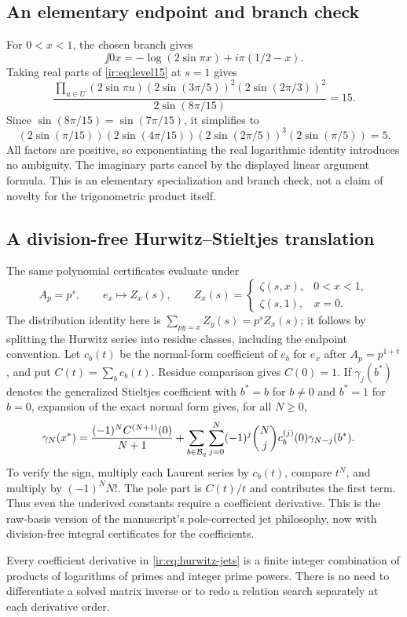 \subsection{An elementary endpoint and branch check}
For $0<x<1$, the chosen branch gives
\[
 \jj{0}{x}=-\log(2\sin\pi x)+i\pi(1/2-x).
\]
Taking real parts of \eqref{ir:eq:level15} at $s=1$ gives
\[
 \frac{\prod_{u\in U}(2\sin\pi u)
 (2\sin(3\pi/5))^2(2\sin(2\pi/3))^2}
 {2\sin(8\pi/15)}=15.
\]
Since $\sin(8\pi/15)=\sin(7\pi/15)$, it simplifies to
\begin{equation}\label{ir:eq:sine-product}
 (2\sin(\pi/15))(2\sin(4\pi/15))
 (2\sin(2\pi/5))^3(2\sin(\pi/5))=5.
\end{equation}
All factors are positive, so exponentiating the real logarithmic identity
introduces no ambiguity. The imaginary parts cancel by the displayed
linear argument formula. This is an elementary specialization and branch
check, not a claim of novelty for the trigonometric product itself.

\subsection{A division-free Hurwitz--Stieltjes translation}
The same polynomial certificates evaluate under
\[
 A_p=p^s,\qquad e_x\mapsto Z_x(s),\qquad
 Z_x(s)=\begin{cases}\zeta(s,x),&0<x<1,\\\zeta(s,1),&x=0.\end{cases}
\]
The distribution identity here is
$\sum_{py=x}Z_y(s)=p^sZ_x(s)$; it follows by splitting the Hurwitz
series into residue classes, including the endpoint convention.
Let $c_b(t)$ be the normal-form coefficient of $e_b$ for $e_x$ after
$A_p=p^{1+t}$, and put $C(t)=\sum_b c_b(t)$.
Residue comparison gives $C(0)=1$. If
$\gamma_j(b^*)$ denotes the generalized Stieltjes coefficient with
$b^*=b$ for $b\ne0$ and $b^*=1$ for $b=0$, expansion of the exact
normal form gives, for all $N\ge0$,
\begin{align}
 \gamma_N(x^*)={}&
 \frac{(-1)^N C^{(N+1)}(0)}{N+1}
 +\sum_{b\in\mathcal B_q}\sum_{j=0}^{N}
 (-1)^j\binom Nj c_b^{(j)}(0)\gamma_{N-j}(b^*).
 \label{ir:eq:hurwitz-jets}
\end{align}
To verify the sign, multiply each Laurent series by $c_b(t)$, compare
$t^N$, and multiply by $(-1)^NN!$. The pole part is $C(t)/t$ and
contributes the first term. Thus even the underived constants require
a coefficient derivative. This is the raw-basis version of the
manuscript's pole-corrected jet philosophy, now with division-free
integral certificates for the coefficients.

Every coefficient derivative in \eqref{ir:eq:hurwitz-jets} is a finite
integer combination of products of logarithms of primes and integer
prime powers. There is no need to differentiate a solved matrix inverse
or to redo a relation search separately at each derivative order.
